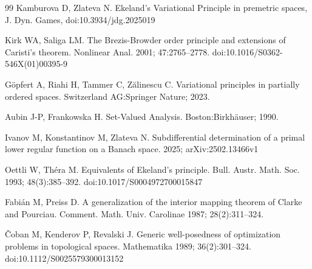 \documentclass[12pt]{article}
\begin{document}
\begin{thebibliography}{99}
Kamburova D, Zlateva N. Ekeland's Variational Principle in premetric spaces, J. Dyn. Games, doi:10.3934/jdg.2025019

Kirk WA, Saliga LM. The Brezis-Browder order principle and extensions of Caristi's theorem.
Nonlinear Anal. 2001; 47:2765--2778. doi:10.1016/S0362-546X(01)00395-9

G\"opfert A, Riahi H, Tammer C, Z\u{a}linescu C.  Variational principles in partially ordered spaces.  Switzerland AG:Springer Nature; 2023.

Aubin J-P, Frankowska H. Set-Valued Analysis. Boston:Birkh\"auser; 1990.

Ivanov M, Konstantinov M, Zlateva N. Subdifferential determination of a primal lower regular function on a Banach space. 2025; arXiv:2502.13466v1

Oettli W, Th\'era M. Equivalents of Ekeland's principle. Bull. Austr. Math. Soc. 1993; 48(3):385--392. doi:10.1017/S0004972700015847

Fabi\'an M, Preiss D. A generalization of the interior mapping theorem of Clarke and Pourciau. Comment. Math. Univ. Carolinae 1987; 28(2):311--324.

\v{C}oban  M, Kenderov P, Revalski J. Generic well-posedness of optimization problems in topological spaces.
Mathematika 1989; 36(2):301--324. doi:10.1112/S0025579300013152

\end{thebibliography}
\end{document}
